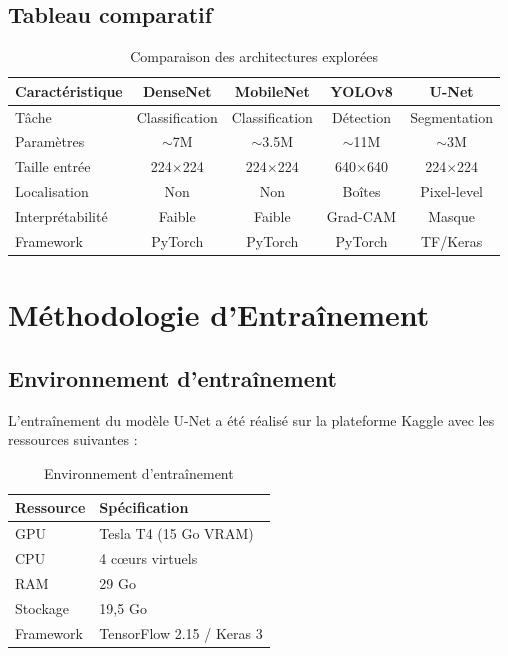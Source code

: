 \documentclass[12pt,a4paper,twoside]{report}
\begin{document}
\section{Tableau comparatif}

\begin{table}[H]
\centering
\begin{tabular}{lcccc}
\toprule
\textbf{Caractéristique} & \textbf{DenseNet} & \textbf{MobileNet} & \textbf{YOLOv8} & \textbf{U-Net} \\
\midrule
Tâche & Classification & Classification & Détection & Segmentation \\
Paramètres & $\sim$7M & $\sim$3.5M & $\sim$11M & $\sim$3M \\
Taille entrée & 224$\times$224 & 224$\times$224 & 640$\times$640 & 224$\times$224 \\
Localisation & Non & Non & Boîtes & Pixel-level \\
Interprétabilité & Faible & Faible & Grad-CAM & Masque \\
Framework & PyTorch & PyTorch & PyTorch & TF/Keras \\
\bottomrule
\end{tabular}
\caption{Comparaison des architectures explorées}
\end{table}

\chapter{Méthodologie d'Entraînement}

\section{Environnement d'entraînement}

L'entraînement du modèle U-Net a été réalisé sur la plateforme Kaggle avec les ressources suivantes :

\begin{table}[H]
\centering
\begin{tabular}{ll}
\toprule
\textbf{Ressource} & \textbf{Spécification} \\
\midrule
GPU & Tesla T4 (15 Go VRAM) \\
CPU & 4 cœurs virtuels \\
RAM & 29 Go \\
Stockage & 19,5 Go \\
Framework & TensorFlow 2.15 / Keras 3 \\
\bottomrule
\end{tabular}
\caption{Environnement d'entraînement}
\end{table}
\end{document}
